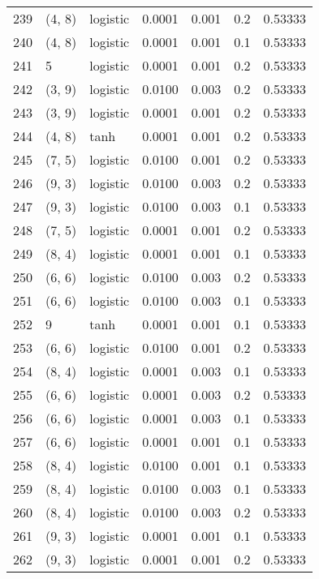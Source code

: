 \begin{tabular}{lllrrrr}
239 &      (4, 8) &  logistic &  0.0001 &  0.001 &  0.2 &   0.53333 \\
240 &      (4, 8) &  logistic &  0.0001 &  0.001 &  0.1 &   0.53333 \\
241 &           5 &  logistic &  0.0001 &  0.001 &  0.2 &   0.53333 \\
242 &      (3, 9) &  logistic &  0.0100 &  0.003 &  0.2 &   0.53333 \\
243 &      (3, 9) &  logistic &  0.0001 &  0.001 &  0.2 &   0.53333 \\
244 &      (4, 8) &      tanh &  0.0001 &  0.001 &  0.2 &   0.53333 \\
245 &      (7, 5) &  logistic &  0.0100 &  0.001 &  0.2 &   0.53333 \\
246 &      (9, 3) &  logistic &  0.0100 &  0.003 &  0.2 &   0.53333 \\
247 &      (9, 3) &  logistic &  0.0100 &  0.003 &  0.1 &   0.53333 \\
248 &      (7, 5) &  logistic &  0.0001 &  0.001 &  0.2 &   0.53333 \\
249 &      (8, 4) &  logistic &  0.0001 &  0.001 &  0.1 &   0.53333 \\
250 &      (6, 6) &  logistic &  0.0100 &  0.003 &  0.2 &   0.53333 \\
251 &      (6, 6) &  logistic &  0.0100 &  0.003 &  0.1 &   0.53333 \\
252 &           9 &      tanh &  0.0001 &  0.001 &  0.1 &   0.53333 \\
253 &      (6, 6) &  logistic &  0.0100 &  0.001 &  0.2 &   0.53333 \\
254 &      (8, 4) &  logistic &  0.0001 &  0.003 &  0.1 &   0.53333 \\
255 &      (6, 6) &  logistic &  0.0001 &  0.003 &  0.2 &   0.53333 \\
256 &      (6, 6) &  logistic &  0.0001 &  0.003 &  0.1 &   0.53333 \\
257 &      (6, 6) &  logistic &  0.0001 &  0.001 &  0.1 &   0.53333 \\
258 &      (8, 4) &  logistic &  0.0100 &  0.001 &  0.1 &   0.53333 \\
259 &      (8, 4) &  logistic &  0.0100 &  0.003 &  0.1 &   0.53333 \\
260 &      (8, 4) &  logistic &  0.0100 &  0.003 &  0.2 &   0.53333 \\
261 &      (9, 3) &  logistic &  0.0001 &  0.001 &  0.1 &   0.53333 \\
262 &      (9, 3) &  logistic &  0.0001 &  0.001 &  0.2 &   0.53333 \\

\end{tabular}
